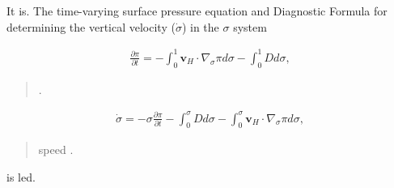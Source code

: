 It is. The time-varying surface pressure equation and Diagnostic Formula
for determining the vertical velocity (\(\dot{\sigma}\)) in the
\(\sigma\) system

\begin{eqnarray}
   \frac{\partial \pi}{\partial t}
   = - \int_{0}^{1} \mathbf{v}_{H} \cdot \nabla_{\sigma} \pi d \sigma
     - \int_{0}^{1} D  d \sigma ,
\end{eqnarray}

\begin{quote}
\protect\hypertarget{barometricux20pressureux20trend}{}{\blindness }.
\end{quote}

\begin{eqnarray}
   \dot{\sigma}
   = - \sigma
     \frac{\partial \pi}{\partial t}
     - \int_{0}^{\sigma} D d \sigma
     - \int_{0}^{\sigma}
         \mathbf{v}_{H} \cdot \nabla_{\sigma} \pi d \sigma ,
\end{eqnarray}

\begin{quote}
\protect\hypertarget{verticalux20speed}{}{\blazing speed }.
\end{quote}

is led.
